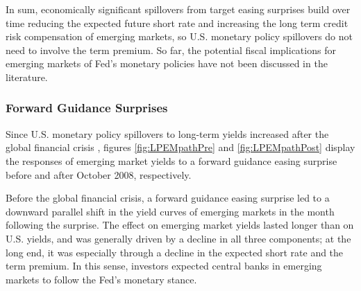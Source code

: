 {%
In sum, economically significant spillovers from target easing surprises build over time reducing the expected future short rate and increasing the long term credit risk compensation of emerging markets, so U.S. monetary policy spillovers do not need to involve the term premium.
So far, the potential fiscal implications for emerging markets of Fed's monetary policies have not been discussed in the literature. 


\subsubsection{Forward Guidance Surprises}
\iftoggle{toclinks}{\gototoc}{} %

Since U.S. monetary policy spillovers to long-term yields increased after the global financial crisis \citep{Albaglietal:2019}, figures \ref{fig:LPEMpathPre} and \ref{fig:LPEMpathPost} display the responses of emerging market yields to a forward guidance easing surprise before and after October 2008, respectively.

%	

Before the global financial crisis, a forward guidance easing surprise led to a downward parallel shift in the yield curves of emerging markets in the month following the surprise.
The effect on emerging market yields lasted longer than on U.S. yields, and was generally driven by a decline in all three components; at the long end, it was especially through a decline in the expected short rate and the term premium.
In this sense, investors expected central banks in emerging markets to follow the Fed's monetary stance. 

}
